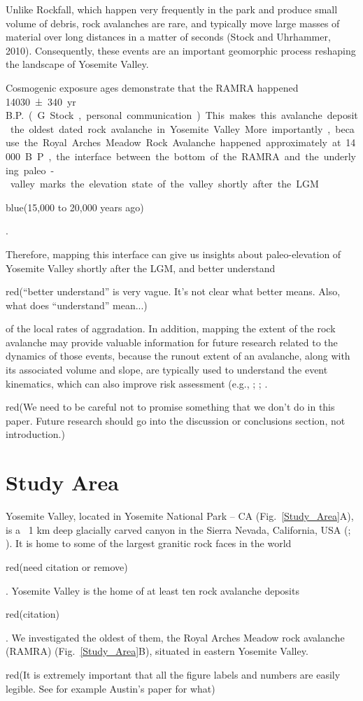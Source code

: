 \documentclass[5p]{elsarticle}
\newcommand{\COMON}{\begin{color}{blue}}
\newcommand{\COMOFF}{\end{color}}
\newcommand{\alon}{\begin{color}{red}}
\newcommand{\aloff}{\end{color}}
\begin{document}
Unlike Rockfall, which happen very frequently in the park and produce small volume of debris, rock avalanches are rare, and typically move large masses of material over long distances in a matter of seconds (Stock and Uhrhammer, 2010). Consequently, these events are an important geomorphic process reshaping the landscape of Yosemite Valley. 

  Cosmogenic  exposure ages demonstrate that the RAMRA happened \SI{14030 \pm 340}{yr\, B.P.} (G. Stock, personal communication). This makes this avalanche deposit the oldest dated rock avalanche in Yosemite Valley. More importantly, because the Royal Arches Meadow Rock Avalanche happened approximately at 14000 B.P., the interface between the bottom of the RAMRA and the underlying paleo-valley marks the elevation state of the valley shortly after the LGM \COMON(15,000 to 20,000 years ago)\COMOFF. 

Therefore, mapping this interface can give us insights about paleo-elevation of Yosemite Valley shortly after the LGM, and better understand \alon (``better understand'' is very vague. It's not clear what better means. Also, what does ``understand'' mean...) \aloff of the local rates of aggradation. In addition, mapping the extent of the rock avalanche may provide valuable information for future research related to the dynamics of those events, because the runout extent of an avalanche, along with its associated volume and slope, are typically used to understand the event kinematics, which can also improve risk assessment (e.g., \cite{wieczorek1998rockfall}; \cite{guzzetti2003rockfall}; \cite{stock2014quantitative}. \alon (We need to be careful not to promise something that we don't do in this paper. Future research should go into the discussion or conclusions section, not introduction.) \aloff





\section{Study Area}

Yosemite Valley, located in Yosemite National Park -- CA (Fig.~\ref{Study_Area}A), is a ~1  km deep glacially carved canyon in the Sierra Nevada, California, USA (\cite{matthes1930geologic}; \cite{huber1987geologic}). It is home to some of the largest granitic rock faces in the world \alon (need citation or remove)\aloff. Yosemite Valley is the home of at least ten rock avalanche deposits \alon(citation)\aloff. We investigated the oldest of them, the Royal Arches Meadow rock avalanche (RAMRA) (Fig.~\ref{Study_Area}B), situated in eastern Yosemite Valley. \alon(It is extremely important that all the figure labels and numbers are easily legible. See for example Austin's paper for what)\aloff
\end{document}
